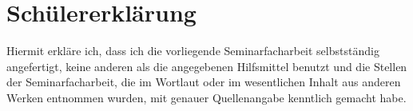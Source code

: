 \documentclass[11pt]{article}
\begin{document}
\section*{Schülererklärung}
Hiermit erkläre ich, dass ich die vorliegende Seminarfacharbeit selbstständig angefertigt,
keine anderen als die angegebenen Hilfsmittel benutzt und die Stellen der Seminarfacharbeit,
die im Wortlaut oder im wesentlichen Inhalt aus anderen Werken entnommen wurden,
mit genauer Quellenangabe kenntlich gemacht habe.
\end{document}
